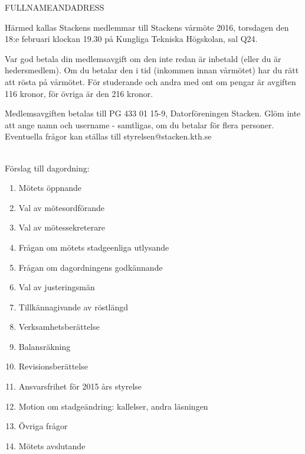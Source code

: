 \documentclass[fontsize=11pt,enlargefirstpage,firstfoot=false,a4paper,pagenumber=no]{scrlttr2}
\begin{document}
 
\begin{letter}{FULLNAMEANDADRESS}

\opening{Härmed kallas Stackens medlemmar till Stackens vårmöte 2016, torsdagen den 18:e februari klockan 19.30 på Kungliga Tekniska Högskolan, sal Q24.}

Var god betala din medlemsavgift om den inte redan är inbetald (eller du är hedersmedlem). Om du betalar den i tid (inkommen innan vårmötet) har du rätt att rösta på vårmötet. För studerande och andra med ont om pengar är avgiften 116 kronor, för övriga är den 216 kronor.

Medlemsavgiften betalas till PG 433 01 15-9, Datorföreningen Stacken. Glöm inte att ange namn och username - samtligas, om du betalar för flera personer. Eventuella frågor kan ställas till styrelsen@stacken.kth.se

~\\
Förslag till dagordning:

\begin{multicols}{2}
\begin{enumerate}
	\itemsep0em
	\item  Mötets öppnande
	\item  Val av mötesordförande
	\item  Val av mötessekreterare
	\item  Frågan om mötets stadgeenliga utlysande
	\item  Frågan om dagordningens godkännande
	\item  Val av justeringsmän
	\item  Tillkännagivande av röstlängd
	\item  Verksamhetsberättelse
	\item  Balansräkning
	\item  Revisionsberättelse
	\item  Ansvarsfrihet för 2015 års styrelse
	\item  Motion om stadgeändring: kallelser, andra läsningen
	\item  Övriga frågor
	\item  Mötets avslutande
\end{enumerate}
\end{multicols}

\closing{}
\enlargethispage{3\baselineskip}

\end{letter}
\end{document}

